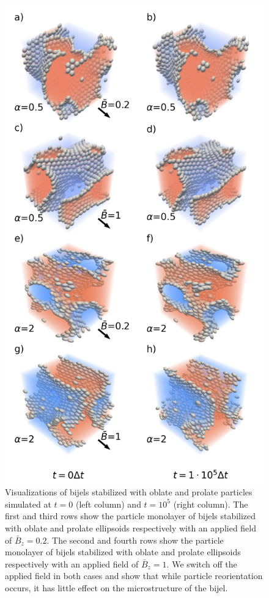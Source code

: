 \begin{figure} 
\centering 
\includegraphics[scale=0.4]{../figures/results/paper2/microstructure_viz-field_down.png} 
\caption{Visualizations of bijels stabilized with oblate and prolate particles simulated at $t = 0$ (left column) and $t = 10^5$ (right column). The first and third rows show the particle monolayer of bijels stabilized with oblate and prolate ellipsoids respectively with an applied field of $\bar{B}_z = 0.2$. The second and fourth rows show the particle monolayer of bijels stabilized with oblate and prolate ellipsoids respectively with an applied field of $\bar{B}_z = 1$. We switch off the applied field in both cases and show that while particle reorientation occurs, it has little effect on the microstructure of the bijel.}
\label{fig:microstructure_viz-field_down}
\end{figure}

